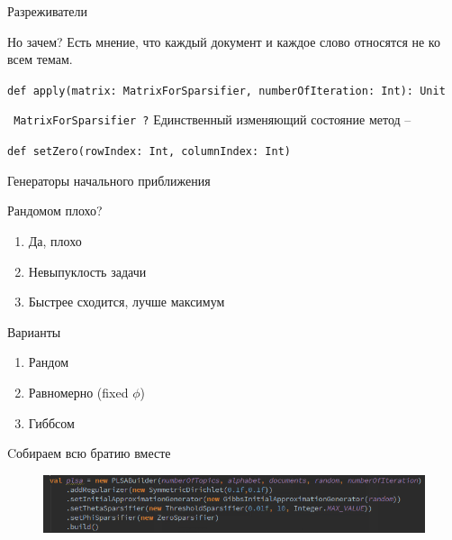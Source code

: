 \documentclass{beamer}
\begin{document}
\begin{frame}{Разреживатели}
\begin{block}{Но зачем?}
Есть мнение, что каждый документ и каждое слово относятся не ко всем темам.

\texttt{def apply(matrix: MatrixForSparsifier, numberOfIteration: Int): Unit}
\end{block}

\begin{block}{\texttt{ MatrixForSparsifier ?}}
Единственный изменяющий состояние метод -- 

\texttt{def setZero(rowIndex: Int, columnIndex: Int)}
\end{block}
\end{frame}

\begin{frame}{ Генераторы начального приближения}
\begin{block}{Рандомом плохо?}
\begin{enumerate}
\item Да, плохо
\item Невыпуклость задачи
\item Быстрее сходится, лучше максимум
\end{enumerate}
\end{block}

\begin{block}{Варианты}
\begin{enumerate}
\item Рандом
\item Равномерно (fixed $\phi$)
\item Гиббсом
\end{enumerate}
\end{block}
\end{frame}


\begin{frame}{Cобираем всю братию вместе}

\begin{figure}[ht!]
\centering
\includegraphics[width=115mm]{builderConfugration.png}
\label{overflow}
\end{figure}

\end{frame}
\end{document}
